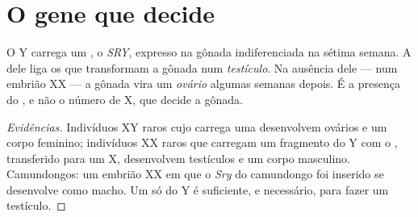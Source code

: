 \section{O gene que decide}

\begin{proposition}\label{prop:g11:becoming-male-female:sry}
O  Y carrega um , o \emph{SRY},
expresso na gônada indiferenciada na sétima semana. A  dele
liga os  que transformam a gônada num \emph{testículo}. Na
ausência dele --- num embrião XX --- a gônada vira um \emph{ovário}
algumas semanas depois. É a presença do , e não o número de
 X, que decide a gônada.
\end{proposition}
\begin{proof}[Evidências]
Indivíduos XY raros cujo  carrega uma  desenvolvem
ovários e um corpo feminino; indivíduos XX raros que carregam um
fragmento do Y com o , transferido para um X, desenvolvem testículos
e um corpo masculino. Camundongos: um embrião XX em que o 
\emph{Sry} do camundongo foi inserido se desenvolve como macho. Um só
 do Y é suficiente, e necessário, para fazer um testículo.
\end{proof}

